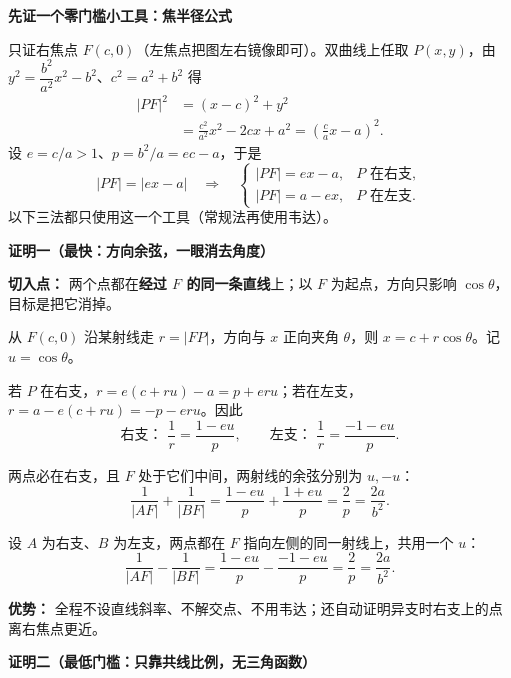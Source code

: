 \begin{proofbox}
  \textbf{\textcolor{CProof}{先证一个零门槛小工具：焦半径公式}}

  只证右焦点 $F(c,0)$（左焦点把图左右镜像即可）。双曲线上任取 $P(x,y)$，由
  $y^2=\dfrac{b^2}{a^2}x^2-b^2$、$c^2=a^2+b^2$ 得
  \[
    \begin{aligned}
      |PF|^2&=(x-c)^2+y^2\\
      &=\frac{c^2}{a^2}x^2-2cx+a^2
       =\left(\frac ca x-a\right)^2.
    \end{aligned}
  \]
  设 $e=c/a>1$、$p=b^2/a=ec-a$，于是
  \[
    \boxed{|PF|=|ex-a|}
    \quad\Longrightarrow\quad
    \begin{cases}
      |PF|=ex-a,&P\text{ 在右支},\\
      |PF|=a-ex,&P\text{ 在左支}.
    \end{cases}
  \]
  以下三法都只使用这一个工具（常规法再使用韦达）。

  \medskip
  \textbf{\textcolor{CProof}{证明一（最快：方向余弦，一眼消去角度）}}

  \textbf{切入点：} 两个点都在\textbf{经过 $F$ 的同一条直线}上；以 $F$ 为起点，方向只影响 $\cos\theta$，目标是把它消掉。

  从 $F(c,0)$ 沿某射线走 $r=|FP|$，方向与 $x$ 正向夹角 $\theta$，则 $x=c+r\cos\theta$。记 $u=\cos\theta$。
  \begin{description}[style=nextline,leftmargin=2.8em,labelsep=0.5em,itemsep=0.4em]
    \item[\textbf{一步：写出射线上的倒数。}]
    若 $P$ 在右支，$r=e(c+ru)-a=p+eru$；若在左支，$r=a-e(c+ru)=-p-eru$。因此
    \[
      \boxed{\text{右支： }\frac1r=\frac{1-eu}{p}},\qquad
      \boxed{\text{左支： }\frac1r=\frac{-1-eu}{p}}.
    \]
    \item[\textbf{同支：相反方向，直接加。}]
    两点必在右支，且 $F$ 处于它们中间，两射线的余弦分别为 $u,-u$：
    \[
      \frac1{|AF|}+\frac1{|BF|}
      =\frac{1-eu}{p}+\frac{1+eu}{p}
      =\boxed{\frac2p=\frac{2a}{b^2}}.
    \]
    \item[\textbf{异支：同一方向，直接减。}]
    设 $A$ 为右支、$B$ 为左支，两点都在 $F$ 指向左侧的同一射线上，共用一个 $u$：
    \[
      \frac1{|AF|}-\frac1{|BF|}
      =\frac{1-eu}{p}-\frac{-1-eu}{p}
      =\boxed{\frac2p=\frac{2a}{b^2}}.
    \]
  \end{description}
  \textbf{优势：} 全程不设直线斜率、不解交点、不用韦达；还自动证明异支时右支上的点离右焦点更近。

  \medskip
  \textbf{\textcolor{CProof}{证明二（最低门槛：只靠共线比例，无三角函数）}}


\end{proofbox}
